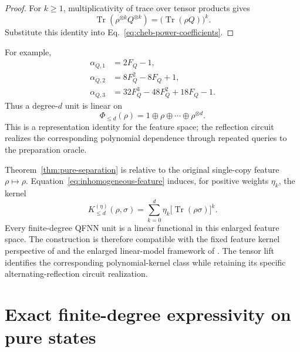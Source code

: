 \documentclass[pdflatex,sn-mathphys,NameDate,iicol]{sn-jnl}
\newcommand{\Tr}{\operatorname{Tr}}
\begin{document}
\begin{proof}
For $k\ge1$, multiplicativity of trace over tensor products gives
\begin{equation}
  \Tr\!\left(\rho^{\otimes k}Q^{\otimes k}\right)
  =
  \bigl(\Tr(\rho Q)\bigr)^k.
\end{equation}
Substitute this identity into Eq.~\eqref{eq:cheb-power-coefficients}.
\end{proof}

For example,
\begin{align}
  \alpha_{Q,1}&=2F_Q-1,\\
  \alpha_{Q,2}&=8F_Q^2-8F_Q+1,\\
  \alpha_{Q,3}&=32F_Q^3-48F_Q^2+18F_Q-1.
\end{align}
Thus a degree-$d$ unit is linear on
\begin{equation}
  \Phi_{\le d}(\rho)
  =
  1\oplus\rho\oplus\cdots\oplus\rho^{\otimes d}.
  \label{eq:inhomogeneous-feature}
\end{equation}
This is a representation identity for the feature space; the reflection
circuit realizes the corresponding polynomial dependence through repeated
queries to the preparation oracle.

\begin{remark}
\label{rem:schuld-kernel}
Theorem~\ref{thm:pure-separation} is relative to the original single-copy
feature $\rho\mapsto\rho$.
Equation~\eqref{eq:inhomogeneous-feature} induces, for positive weights
$\eta_k$, the kernel
\begin{equation}
  K_{\le d}^{(\eta)}(\rho,\sigma)
  =
  \sum_{k=0}^{d}
  \eta_k\bigl[\Tr(\rho\sigma)\bigr]^k.
  \label{eq:inhomogeneous-kernel}
\end{equation}
Every finite-degree QFNN unit is a linear functional in this enlarged
feature space. The construction is therefore compatible with the fixed
feature kernel perspective of \citet{schuld2021kernel} and the enlarged
linear-model framework of \citet{jerbi2023beyond}. The tensor lift identifies
the corresponding polynomial-kernel class while retaining its specific
alternating-reflection circuit realization.
\end{remark}

\section{Exact finite-degree expressivity on pure states}
\label{sec:finite-expressivity}
\end{document}
